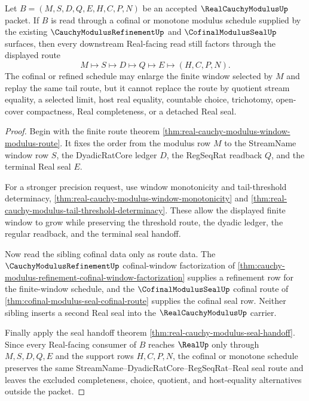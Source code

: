 \begin{theorem}
\label{thm:real-cauchy-modulus-cofinal-refinement-handoff}
Let $B=(M,S,D,Q,E,H,C,P,N)$ be an accepted $\RealCauchyModulusUp$ packet. If $B$ is read through a cofinal or monotone modulus schedule supplied by the existing $\CauchyModulusRefinementUp$ and $\CofinalModulusSealUp$ surfaces, then every downstream Real-facing read still factors through the displayed route
$$
M\longmapsto S\longmapsto D\longmapsto Q\longmapsto E\longmapsto(H,C,P,N).
$$
The cofinal or refined schedule may enlarge the finite window selected by $M$ and replay the same tail route, but it cannot replace the route by quotient stream equality, a selected limit, host real equality, countable choice, trichotomy, open-cover compactness, Real completeness, or a detached Real seal.
\end{theorem}
\begin{proof}
Begin with the finite route theorem \autoref{thm:real-cauchy-modulus-window-modulus-route}. It fixes the order from the modulus row $M$ to the StreamName window row $S$, the DyadicRatCore ledger $D$, the RegSeqRat readback $Q$, and the terminal Real seal $E$.

For a stronger precision request, use window monotonicity and tail-threshold determinacy, \autoref{thm:real-cauchy-modulus-window-monotonicity} and \autoref{thm:real-cauchy-modulus-tail-threshold-determinacy}. These allow the displayed finite window to grow while preserving the threshold route, the dyadic ledger, the regular readback, and the terminal seal handoff.

Now read the sibling cofinal data only as route data. The $\CauchyModulusRefinementUp$ cofinal-window factorization of \autoref{thm:cauchy-modulus-refinement-cofinal-window-factorization} supplies a refinement row for the finite-window schedule, and the $\CofinalModulusSealUp$ cofinal route of \autoref{thm:cofinal-modulus-seal-cofinal-route} supplies the cofinal seal row. Neither sibling inserts a second Real seal into the $\RealCauchyModulusUp$ carrier.

Finally apply the seal handoff theorem \autoref{thm:real-cauchy-modulus-seal-handoff}. Since every Real-facing consumer of $B$ reaches $\RealUp$ only through $M,S,D,Q,E$ and the support rows $H,C,P,N$, the cofinal or monotone schedule preserves the same StreamName--DyadicRatCore--RegSeqRat--Real seal route and leaves the excluded completeness, choice, quotient, and host-equality alternatives outside the packet.
\end{proof}

